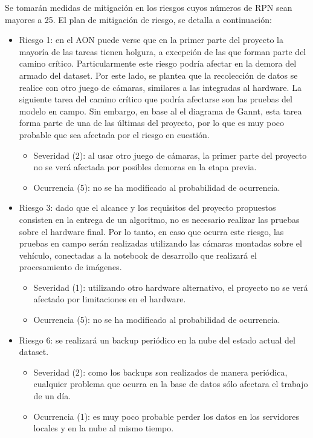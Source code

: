 \documentclass[
11pt, %
codirector, %
]{charter}
\begin{document}
Se tomarán medidas de mitigación en los riesgos cuyos números de RPN sean mayores a 25. El plan de mitigación de riesgo, se detalla a continuación:

\begin{itemize}

	\item Riesgo 1: en el AON puede verse que en la primer parte del proyecto la mayoría de las tareas tienen holgura, a excepción de las que forman parte del camino crítico. Particularmente este riesgo podría afectar en la demora del armado del dataset. Por este lado, se plantea que la recolección de datos se realice con otro juego de cámaras, similares a las integradas al hardware. La siguiente tarea del camino crítico que podría afectarse son las pruebas del modelo en campo. Sin embargo, en base al el diagrama de Gannt, esta tarea forma parte de una de las últimas del proyecto, por lo que es muy poco probable que sea afectada por el riesgo en cuestión.
	\begin{itemize}
		\item Severidad (2): al usar otro juego de cámaras, la primer parte del proyecto no se verá afectada por posibles demoras en la etapa previa.
		\item Ocurrencia (5): no se ha modificado al probabilidad de ocurrencia.
	\end{itemize}
	
	\item Riesgo 3: dado que el alcance y los requisitos del proyecto propuestos consisten en la entrega de un algoritmo, no es necesario realizar las pruebas sobre el hardware final. Por lo tanto, en caso que ocurra este riesgo, las pruebas en campo serán realizadas utilizando las cámaras montadas sobre el vehículo, conectadas a la notebook de desarrollo que realizará el procesamiento de imágenes.
	\begin{itemize}
		\item Severidad (1): utilizando otro hardware alternativo, el proyecto no se verá afectado por limitaciones en el hardware.
		\item Ocurrencia (5): no se ha modificado al probabilidad de ocurrencia.
	\end{itemize}
	
	\item Riesgo 6: se realizará un backup periódico en la nube del estado actual del dataset.
	\begin{itemize}
		\item Severidad (2): como los backups son realizados de manera periódica, cualquier problema que ocurra en la base de datos sólo afectara el trabajo de un día.
		\item Ocurrencia (1): es muy poco probable perder los datos en los servidores locales y en la nube al mismo tiempo.
	\end{itemize}
\end{itemize}
\end{document}
